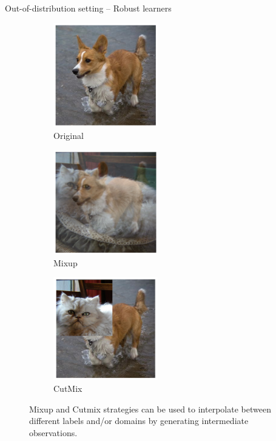 \begin{frame}{Out-of-distribution setting -- Robust learners}
	\begin{figure}[H]
		\centering
		\begin{subfigure}[t]{0.3\textwidth}
			\centering
			\includegraphics[width=0.5\textwidth]{img/distribution/da_original.png}
			\caption{Original}
		\end{subfigure}
		\hspace{0.65em}
		\begin{subfigure}[t]{0.3\textwidth}
			\centering
			\includegraphics[width=0.5\textwidth]{img/distribution/da_mixup.png}
			\caption{Mixup 
			\cite{zhangMixupEmpiricalRisk2018}
			}
		\end{subfigure}
		\hspace{0.65em}
		\begin{subfigure}[t]{0.3\textwidth}
			\centering
			\includegraphics[width=0.5\textwidth]{img/distribution/da_cutmix.png}
			\caption{CutMix
			\cite{yunCutMixRegularizationStrategy2019}
			}
		\end{subfigure}
		   \caption{
			Mixup and Cutmix strategies can be used to interpolate
			between different labels and/or domains
			by generating intermediate observations.
			\cite{yunCutMixRegularizationStrategy2019}
			}
	\end{figure}
	

\end{frame}
